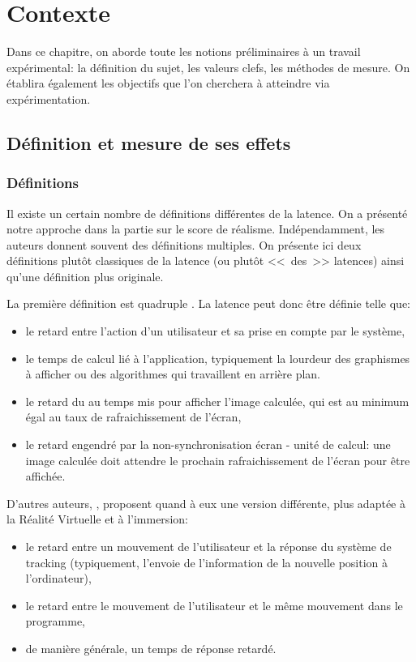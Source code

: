 \chapter{Contexte}
	\par Dans ce chapitre, on aborde toute les notions préliminaires à un travail expérimental: la définition du sujet, les valeurs clefs, les méthodes de mesure. On établira également les objectifs que l'on cherchera à atteindre via expérimentation.
	
	\section{Définition et mesure de ses effets}
	\subsection{Définitions}	
	\par Il existe un certain nombre de définitions différentes de la latence. On a présenté notre approche dans la partie sur le score de réalisme. Indépendamment, les auteurs donnent souvent des définitions multiples. On présente ici deux définitions plutôt classiques de la latence (ou plutôt <<~des~>> latences) ainsi qu'une définition plus originale.
	
	\par La première définition est quadruple \citep{papadakis_system_2011}. La latence peut donc être définie telle que:
	\begin{itemize}
		\item le retard entre l'action d'un utilisateur et sa prise en compte par le système,
		\item le temps de calcul lié à l'application, typiquement la lourdeur des graphismes à afficher ou des algorithmes qui travaillent en arrière plan.
		\item le retard du au temps mis pour afficher l'image calculée, qui est au minimum égal au taux de rafraichissement de l'écran,
		\item le retard engendré par la non-synchronisation écran - unité de calcul: une image calculée doit attendre le prochain rafraichissement de l'écran pour être affichée.
	\end{itemize}		
	
	\par D'autres auteurs, \citep{hale_handbook_2015}, proposent quand à eux une version différente, plus adaptée à la Réalité Virtuelle et à l'immersion:
	\begin{itemize}
		\item le retard entre un mouvement de l'utilisateur et la réponse du système de tracking (typiquement, l'envoie de l'information de la nouvelle position à l'ordinateur),
		\item le retard entre le mouvement de l'utilisateur et le même mouvement dans le programme,
		\item de manière générale, un temps de réponse retardé.
	\end{itemize}		
	
